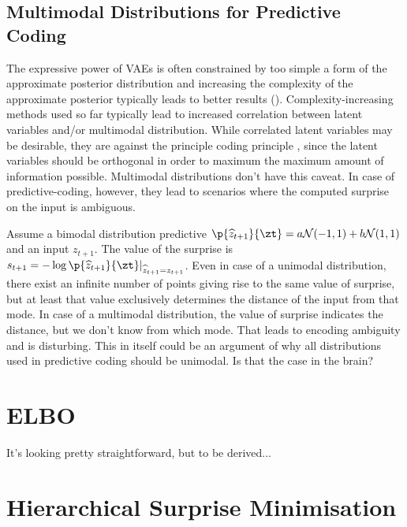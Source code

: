 \documentclass[]{article}
\begin{document}
	\subsection{Multimodal Distributions for Predictive Coding}
	
	The expressive power of VAEs is often constrained by too simple a form of the approximate posterior distribution and increasing the complexity of the approximate posterior typically leads to better results (\cite{Rezende2015, Kingma2016, Karl2016}). Complexity-increasing methods used so far typically lead to increased correlation between latent variables and/or multimodal distribution. While correlated latent variables may be desirable, they are against the principle coding principle , since the latent variables should be orthogonal in order to maximum the maximum amount of information possible. Multimodal distributions don't have this caveat. In case of predictive-coding, however, they lead to scenarios where the computed surprise on the input is ambiguous. 
	
	Assume a bimodal distribution predictive $\p{\widehat{z}_{t+1}}{\zt} = a \gauss{-1, 1} + b \gauss{1, 1}$ and an input $z_{t+1}$. The value of the surprise is $s_{t+1} = -\log \p{\widehat{z}_{t+1}}{\zt}\lvert_{\widehat{z}_{t+1} = z_{t+1}}$. Even in case of a unimodal distribution, there exist an infinite number of points giving rise to the same value of surprise, but at least that value exclusively determines the distance of the input from that mode. In case of a multimodal distribution, the value of surprise indicates the distance, but we don't know from which mode. That leads to encoding ambiguity and is disturbing. This in itself could be an argument of why all distributions used in predictive coding should be unimodal. Is that the case in the brain?
	
\section{ELBO}
	
	It's looking pretty straightforward, but to be derived...
	
\section{Hierarchical Surprise Minimisation}
\end{document}

